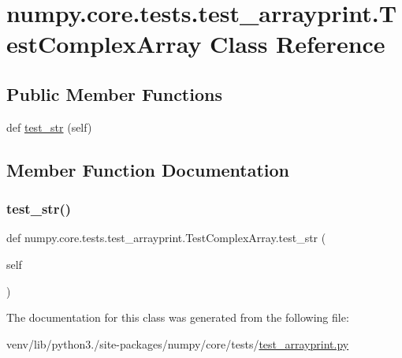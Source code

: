 \hypertarget{classnumpy_1_1core_1_1tests_1_1test__arrayprint_1_1TestComplexArray}{}\section{numpy.\+core.\+tests.\+test\+\_\+arrayprint.\+Test\+Complex\+Array Class Reference}
\label{classnumpy_1_1core_1_1tests_1_1test__arrayprint_1_1TestComplexArray}
\subsection*{Public Member Functions}
\begin{DoxyCompactItemize}
\item 
def \hyperlink{classnumpy_1_1core_1_1tests_1_1test__arrayprint_1_1TestComplexArray_a958ee3b29f4b35a61c712e936d4a9871}{test\+\_\+str} (self)
\end{DoxyCompactItemize}


\subsection{Member Function Documentation}
\mbox{\label{classnumpy_1_1core_1_1tests_1_1test__arrayprint_1_1TestComplexArray_a958ee3b29f4b35a61c712e936d4a9871}} 
\subsubsection{\texorpdfstring{test\+\_\+str()}{test\_str()}}
{\footnotesize\ttfamily def numpy.\+core.\+tests.\+test\+\_\+arrayprint.\+Test\+Complex\+Array.\+test\+\_\+str (\begin{DoxyParamCaption}\item[{}]{self }\end{DoxyParamCaption})}



The documentation for this class was generated from the following file\+:\begin{DoxyCompactItemize}
\item 
venv/lib/python3./site-\/packages/numpy/core/tests/\hyperlink{test__arrayprint_8py}{test\+\_\+arrayprint.\+py}\end{DoxyCompactItemize}
